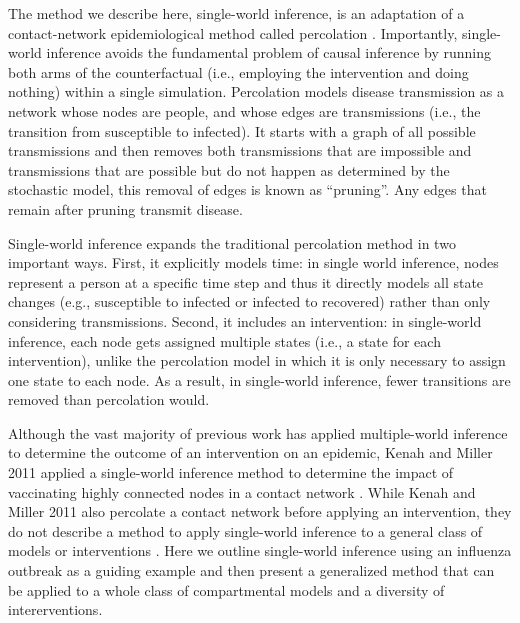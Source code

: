 \documentclass[PTRSB]{rsos}
\begin{document}
The method we describe here, single-world inference, is an adaptation of a contact-network epidemiological method called percolation \cite{miller-book}.
Importantly, single-world inference avoids the fundamental problem of causal inference by running both arms of the counterfactual (i.e., employing the intervention and doing nothing) within a single simulation.
Percolation models disease transmission as a network whose nodes are people, and whose edges are transmissions (i.e., the transition from susceptible to infected).
It starts with a graph of all possible transmissions and then removes both transmissions that are impossible and transmissions that are possible but do not happen as determined by the stochastic model, this removal of edges is known as ``pruning''.
Any edges that remain after pruning transmit disease.

Single-world inference expands the traditional percolation method in two important ways.
First, it explicitly models time: in single world inference, nodes represent a person at a specific time step and thus it directly models all state changes (e.g., susceptible to infected or infected to recovered) rather than only considering transmissions.
Second, it includes an intervention: in single-world inference, each node gets assigned multiple states (i.e., a state for each intervention), unlike the percolation model in which it is only necessary to assign one state to each node.
As a result, in single-world inference, fewer transitions are removed than percolation would.

Although the vast majority of previous work has applied multiple-world inference to determine the outcome of an intervention on an epidemic, Kenah and Miller 2011 applied a single-world inference method to determine the impact of vaccinating highly connected nodes in a contact network \cite{kenah-miller:2011}.
While Kenah and Miller 2011 also percolate a contact network before applying an intervention, they do not describe a method to apply single-world inference to a general class of models or interventions \cite{kenah-miller:2011}.
Here we outline single-world inference using an influenza outbreak as a guiding example and then present a generalized method that can be applied to a whole class of compartmental models and a diversity of intererventions.
\end{document}
